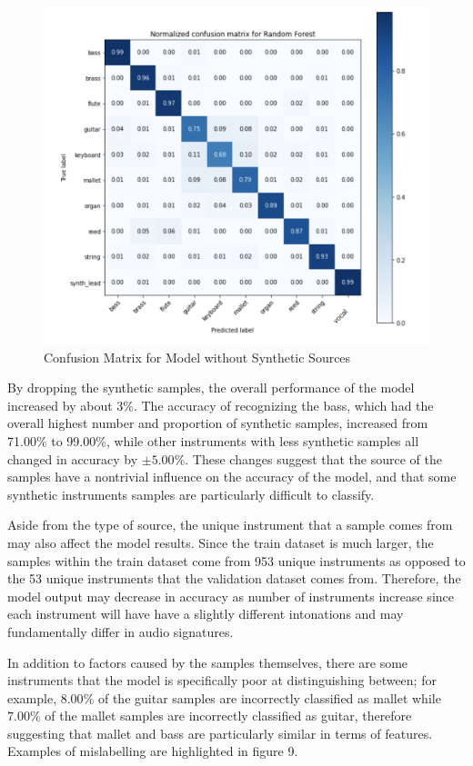 \documentclass{article}
\begin{document}
\begin{figure}[htb]
  \centering
  \includegraphics[width=.6\linewidth]{cm_nonsynth}
  \caption{Confusion Matrix for Model without Synthetic Sources}
\end{figure}

By dropping the synthetic samples, the overall performance of the model increased by about 3\%. The accuracy of recognizing the bass, which had the overall highest number and proportion of synthetic samples, increased from 71.00\% to 99.00\%, while other instruments with less synthetic samples all changed in accuracy by $\pm5.00\%$. These changes suggest that the source of the samples have a nontrivial influence on the accuracy of the model, and that some synthetic instruments samples are particularly difficult to classify.

Aside from the type of source, the unique instrument that a sample comes from may also affect the model results. Since the train dataset is much larger, the samples within the train dataset come from 953 unique instruments as opposed to the 53 unique instruments that the validation dataset comes from. Therefore, the model output may decrease in accuracy as number of instruments increase since each instrument will have have a slightly different intonations and may fundamentally differ in audio signatures.

In addition to factors caused by the samples themselves, there are some instruments that the model is specifically poor at distinguishing between; for example, $8.00\%$ of the guitar samples are incorrectly classified as mallet while $7.00\%$ of the mallet samples are incorrectly classified as guitar, therefore suggesting that mallet and bass are particularly similar in terms of features. Examples of mislabelling are highlighted in figure 9.
\end{document}
